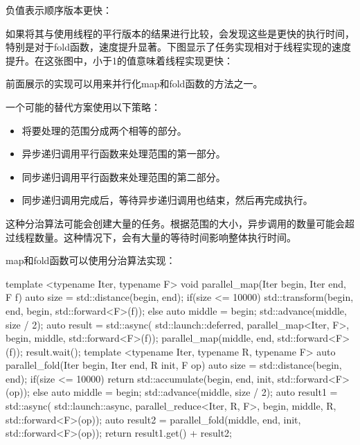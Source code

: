 负值表示顺序版本更快：


如果将其与使用线程的平行版本的结果进行比较，会发现这些是更快的执行时间，特别是对于fold函数，速度提升显著。下图显示了任务实现相对于线程实现的速度提升。在这张图中，小于1的值意味着线程实现更快：



前面展示的实现可以用来并行化map和fold函数的方法之一。

一个可能的替代方案使用以下策略：

\begin{itemize}
\item
将要处理的范围分成两个相等的部分。

\item
异步递归调用平行函数来处理范围的第一部分。

\item
同步递归调用平行函数来处理范围的第二部分。

\item
同步递归调用完成后，等待异步递归调用也结束，然后再完成执行。
\end{itemize}

这种分治算法可能会创建大量的任务。根据范围的大小，异步调用的数量可能会超过线程数量。这种情况下，会有大量的等待时间影响整体执行时间。

map和fold函数可以使用分治算法实现：

\begin{cpp}
template <typename Iter, typename F>
void parallel_map(Iter begin, Iter end, F f)
{
    auto size = std::distance(begin, end);
    if(size <= 10000)
    {
        std::transform(begin, end, begin, std::forward<F>(f));
    }
    else
    {
        auto middle = begin;
        std::advance(middle, size / 2);
        auto result = std::async(
            std::launch::deferred,
            parallel_map<Iter, F>,
            begin, middle, std::forward<F>(f));
        parallel_map(middle, end, std::forward<F>(f));
        result.wait();
    }
}
template <typename Iter, typename R, typename F>
auto parallel_fold(Iter begin, Iter end, R init, F op)
{
    auto size = std::distance(begin, end);
    if(size <= 10000)
        return std::accumulate(begin, end, init, std::forward<F>(op));
    else
    {
        auto middle = begin;
        std::advance(middle, size / 2);
        auto result1 = std::async(
            std::launch::async,
            parallel_reduce<Iter, R, F>,
            begin, middle, R{}, std::forward<F>(op));
        auto result2 = parallel_fold(middle, end, init,
                                     std::forward<F>(op));
        return result1.get() + result2;
    }
}
\end{cpp}

